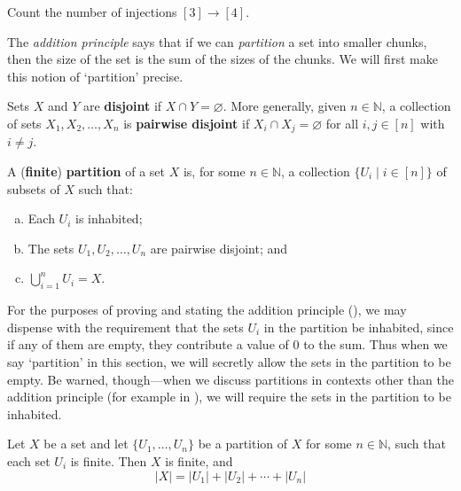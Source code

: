 \begin{exercise}
Count the number of injections $[3] \to [4]$.
\end{exercise}


The \textit{addition principle} says that if we can \textit{partition} a set into smaller chunks, then the size of the set is the sum of the sizes of the chunks. We will first make this notion of `partition' precise.

\begin{definition}
Sets $X$ and $Y$ are \textbf{disjoint} if $X \cap Y = \varnothing$. More generally, given $n \in \mathbb{N}$, a collection of sets $X_1, X_2, \dots, X_n$ is \textbf{pairwise disjoint} if $X_i \cap X_j = \varnothing$ for all $i,j \in [n]$ with $i \ne j$.
\end{definition}

\begin{definition}
\label{defPartitionFinite}
A (\textbf{finite}) \textbf{partition} of a set $X$ is, for some $n \in \mathbb{N}$, a collection $\{ U_i \mid i \in [n] \}$ of subsets of $X$ such that:
\begin{enumerate}[(a)]
\item Each $U_i$ is inhabited;
\item The sets $U_1, U_2, \dots, U_n$ are pairwise disjoint; and
\item $\bigcup_{i = 1}^n U_i = X$.
\end{enumerate}
\end{definition}

For the purposes of proving  and stating the addition principle (), we may dispense with the requirement that the sets $U_i$ in the partition be inhabited, since if any of them are empty, they contribute a value of $0$ to the sum. Thus when we say `partition' in this section, we will secretly allow the sets in the partition to be empty. Be warned, though---when we discuss partitions in contexts other than the addition principle (for example in ), we will require the sets in the partition to be inhabited.

\begin{theorem}
\label{thmAdditionPrinciple}
Let $X$ be a set and let $\{ U_1, \dots, U_n \}$ be a partition of $X$ for some $n \in \mathbb{N}$, such that each set $U_i$ is finite. Then $X$ is finite, and
\[ |X| = |U_1| + |U_2| + \cdots + |U_n| \]
\end{theorem}

